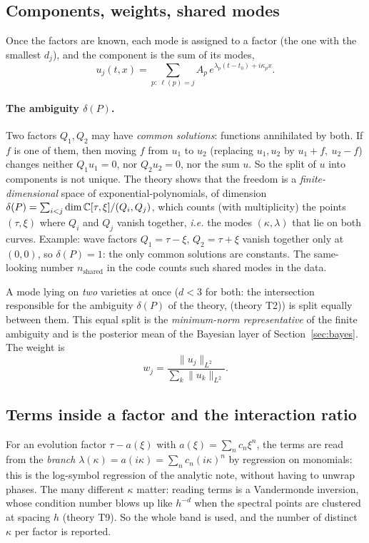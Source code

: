 \documentclass[11pt,a4paper]{article}
\theoremstyle{definition}
\newcommand{\thy}[1]{\textcolor{cG}{\textsf{\footnotesize(theory #1)}}}
\begin{document}
\subsection{Components, weights, shared modes}
Once the factors are known, each mode is assigned to a factor (the one with the smallest $d_j$), and the component is the sum of its modes,
\[
u_j(t,x)=\sum_{p:\ \ell(p)=j}A_p\,e^{\lambda_p(t-t_0)+i\kappa_px}.
\]
\paragraph{The ambiguity $\delta(P)$.} Two factors $Q_1,Q_2$ may have \emph{common solutions}: functions annihilated by both. If $f$ is one of them, then moving $f$ from $u_1$ to $u_2$ (replacing $u_1,u_2$ by $u_1+f,\ u_2-f$) changes neither $Q_1u_1=0$, nor $Q_2u_2=0$, nor the sum $u$. So the split of $u$ into components is not unique. The theory shows that the freedom is a \emph{finite-dimensional} space of exponential-polynomials, of dimension $\delta(P)=\sum_{i<j}\dim\mathbb{C}[\tau,\xi]/(Q_i,Q_j)$, which counts (with multiplicity) the points $(\tau,\xi)$ where $Q_i$ and $Q_j$ vanish together, \emph{i.e.} the modes $(\kappa,\lambda)$ that lie on both curves. Example: wave factors $Q_1=\tau-\xi$, $Q_2=\tau+\xi$ vanish together only at $(0,0)$, so $\delta(P)=1$: the only common solutions are constants. The same-looking number $n_{\mathrm{shared}}$ in the code counts such shared modes in the data.

A mode lying on \emph{two} varieties at once ($d<3$ for both: the intersection responsible for the ambiguity $\delta(P)$ of the theory, \thy{T2}) is split equally between them. This equal split is the \emph{minimum-norm representative} of the finite ambiguity and is the posterior mean of the Bayesian layer of Section~\ref{sec:bayes}. The weight is
\begin{equation}\label{eq:wj}
w_j=\frac{\|u_j\|_{L^2}}{\sum_k\|u_k\|_{L^2}}.
\end{equation}

\subsection{Terms inside a factor and the interaction ratio}
For an evolution factor $\tau-a(\xi)$ with $a(\xi)=\sum_nc_n\xi^n$, the terms are read from the \emph{branch} $\lambda(\kappa)=a(i\kappa)=\sum_nc_n(i\kappa)^n$ by regression on monomials: this is the log-symbol regression of the analytic note, without having to unwrap phases. The many different $\kappa$ matter: reading terms is a Vandermonde inversion, whose condition number blows up like $h^{-d}$ when the spectral points are clustered at spacing $h$ \thy{T9}. So the whole band is used, and the number of distinct $\kappa$ per factor is reported.
\end{document}
